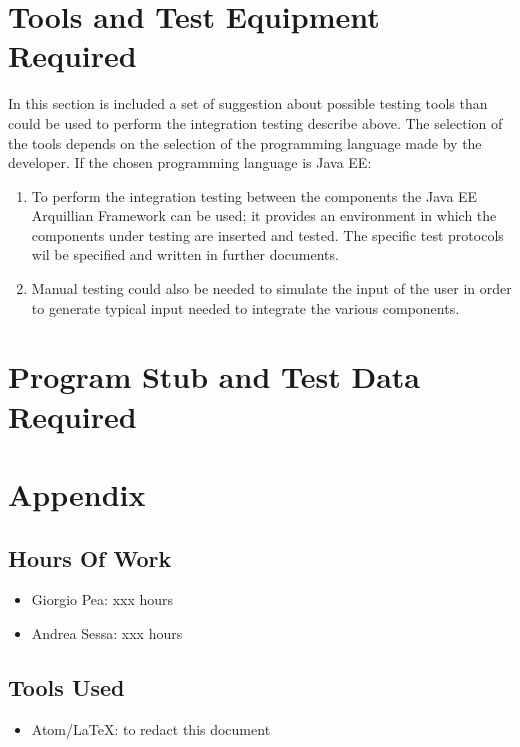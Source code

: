 \documentclass[11pt,titlepage]{article} %
\begin{document}
\section{Tools and Test Equipment Required}
  In this section is included a set of suggestion about possible testing tools than could be used to perform the integration 
  testing describe above.\newline
  The selection of the tools depends on the selection of the programming language made by the developer.\newline
  If the chosen programming language is Java EE:
  \begin{enumerate}
   \item To perform the integration testing between the components the Java EE Arquillian Framework can be used;
	 it provides an environment in which the components under testing are inserted and tested. The specific 
	 test protocols wil be specified and written in further documents.
   \item Manual testing could also be needed to simulate the input of the user in order to generate typical
	 input needed to integrate the various components.
  \end{enumerate}

\section{Program Stub and Test Data Required}
  

\section{Appendix}
  \subsection{Hours Of Work}
    \begin{itemize}
     \item Giorgio Pea: xxx hours
     \item Andrea Sessa: xxx hours
    \end{itemize}

  \subsection{Tools Used}
    \begin{itemize}
     \item  Atom/\LaTeX: to redact this document
    \end{itemize}
\end{document}
